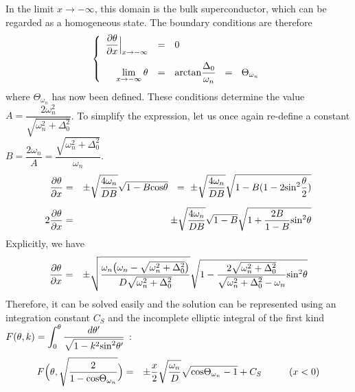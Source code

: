 \documentclass[uplatex,a4j,12pt,dvipdfmx]{jsarticle}
\begin{document}
In the limit $x \to - \infty$,
this domain is the bulk superconductor,
which can be regarded as a homogeneous state.
The boundary conditions are therefore
\begin{eqnarray}
	\left\{
	\begin{array}{rcl}
		\dfrac{\partial \theta}{\partial x} \Big|_{x \to - \infty}
		 & = & 0
		\\[4mm]
		\displaystyle \lim_{x \to - \infty} \theta
		 & = &
		{\rm arctan} \dfrac{\Delta_{0}}{ \omega_{n} }
		\ \ = \ \
		\Theta_{\omega_{n}}
	\end{array}
	\right.
\end{eqnarray}
where $\Theta_{\omega_{n}}$ has now been defined.
These conditions determine the value
$\displaystyle A=\dfrac{2 \omega_{n}^{2}}{ \sqrt{ \omega_{n}^{2} + \Delta_{0}^{2} } }$.
To simplify the expression,
let us once again re-define a constant
$B=\dfrac{2 \omega_{n}}{A} = \dfrac{ \sqrt{ \omega_{n}^{2} + \Delta_{0}^{2} }}{\omega_{n}}$.
\begin{eqnarray}
	\dfrac{\partial \theta}{\partial x}
	&=&
	\pm
	\sqrt{ \dfrac{4 \omega_{n}}{DB} }
	\sqrt{ 1 - B {\rm cos} \theta }
	\ \ = \
	\pm
	\sqrt{ \dfrac{4 \omega_{n}}{DB} }
	\sqrt{ 1 - B (1 - 2 {\rm sin}^{2} \dfrac{\theta}{2} ) }
	\\[2mm]
	2
	\dfrac{\partial \theta}{\partial x}
	&=&
	\pm
	\sqrt{ \dfrac{4 \omega_{n}}{DB} }
	\sqrt{ 1- B }
	\sqrt{ 1 + \dfrac{2B}{1-B} {\rm sin}^{2} \theta }
\end{eqnarray}
Explicitly, we have
\begin{eqnarray}
	\dfrac{\partial \theta}{\partial x}
	&=&
	\pm
	\sqrt{ \dfrac{ \omega_{n} \big( \omega_{n} - \sqrt{\omega_{n}^{2} + \Delta_{0}^{2}} \big) }{ D \sqrt{\omega_{n}^{2} + \Delta_{0}^{2}} } }
	\sqrt{ 1 - \dfrac{ 2 \sqrt{\omega_{n}^{2} + \Delta_{0}^{2}} }{ \sqrt{\omega_{n}^{2} + \Delta_{0}^{2}} - \omega_{n} } {\rm sin}^{2} \theta }
\end{eqnarray}
Therefore, it can be solved easily
and the solution can be represented using
an integration constant $C_{S}$ and
the incomplete elliptic integral of the first kind
$\displaystyle F(\theta,k) = \int^{\theta}_{0} \dfrac{d \theta'}{ \sqrt{1 - k^{2} {\rm sin}^{2} \theta'}}$ :
\begin{eqnarray}
	F \Big(\theta,\sqrt{ \dfrac{2}{ 1 - {\rm cos} \Theta_{\omega_{n}} } } \Big)
	&=&
	\pm
	\dfrac{x}{2}
	\sqrt{ \dfrac{ \omega_{n} }{ D } }
	\sqrt{ {\rm cos} \Theta_{\omega_{n}} - 1 }
	+
	C_{S}
	\hspace{10mm}
	(x<0)
\end{eqnarray}
\end{document}

